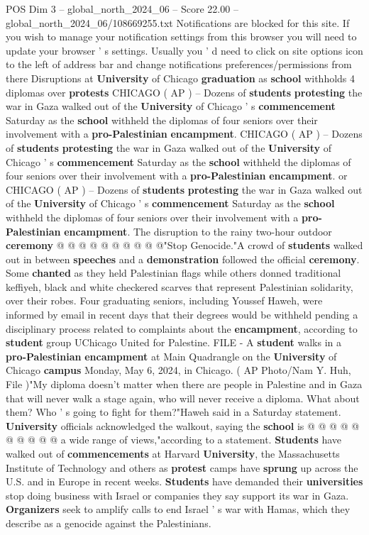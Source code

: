 \begin{textsample}{POS Dim 3 – global\_north\_2024\_06 – Score 22.00 – global\_north\_2024\_06/108669255.txt}  \label{ex:f3_pos_067}
Notifications are blocked for this site.
If you wish to manage your notification settings from this browser you will need to update your browser ' s settings.
Usually you ' d need to click on site options icon to the left of address bar and change notifications preferences/permissions from there Disruptions at \textbf{University} of Chicago \textbf{graduation} as \textbf{school} withholds 4 diplomas over \textbf{protests} CHICAGO ( AP ) -- Dozens of \textbf{students} \textbf{protesting} the war in Gaza walked out of the \textbf{University} of Chicago ' s \textbf{commencement} Saturday as the \textbf{school} withheld the diplomas of four seniors over their involvement with a \textbf{pro-Palestinian} \textbf{encampment}.
CHICAGO ( AP ) -- Dozens of \textbf{students} \textbf{protesting} the war in Gaza walked out of the \textbf{University} of Chicago ' s \textbf{commencement} Saturday as the \textbf{school} withheld the diplomas of four seniors over their involvement with a \textbf{pro-Palestinian} \textbf{encampment}. or CHICAGO ( AP ) -- Dozens of \textbf{students} \textbf{protesting} the war in Gaza walked out of the \textbf{University} of Chicago ' s \textbf{commencement} Saturday as the \textbf{school} withheld the diplomas of four seniors over their involvement with a \textbf{pro-Palestinian} \textbf{encampment}.
The disruption to the rainy two-hour outdoor \textbf{ceremony} @ @ @ @ @ @ @ @ @ @"Stop Genocide."A crowd of \textbf{students} walked out in between \textbf{speeches} and a \textbf{demonstration} followed the official \textbf{ceremony}.
Some \textbf{chanted} as they held Palestinian flags while others donned traditional keffiyeh, black and white checkered scarves that represent Palestinian solidarity, over their robes.
Four graduating seniors, including Youssef Haweh, were informed by email in recent days that their degrees would be withheld pending a disciplinary process related to complaints about the \textbf{encampment}, according to \textbf{student} group UChicago United for Palestine.
FILE - A \textbf{student} walks in a \textbf{pro-Palestinian} \textbf{encampment} at Main Quadrangle on the \textbf{University} of Chicago \textbf{campus} Monday, May 6, 2024, in Chicago. ( AP Photo/Nam Y.
Huh, File )"My diploma doesn't matter when there are people in Palestine and in Gaza that will never walk a stage again, who will never receive a diploma.
What about them?
Who ' s going to fight for them?"Haweh said in a Saturday statement. \textbf{University} officials acknowledged the walkout, saying the \textbf{school} is @ @ @ @ @ @ @ @ @ @ a wide range of views,"according to a statement. \textbf{Students} have walked out of \textbf{commencements} at Harvard \textbf{University}, the Massachusetts Institute of Technology and others as \textbf{protest} camps have \textbf{sprung} up across the U.S. and in Europe in recent weeks. \textbf{Students} have demanded their \textbf{universities} stop doing business with Israel or companies they say support its war in Gaza. \textbf{Organizers} seek to amplify calls to end Israel ' s war with Hamas, which they describe as a genocide against the Palestinians.

\end{textsample}
